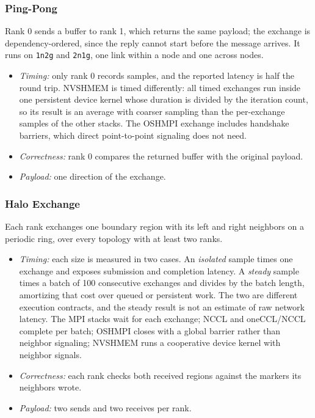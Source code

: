 \subsubsection{Ping-Pong}

Rank 0 sends a buffer to rank 1, which returns the same payload; the exchange is dependency-ordered, since the reply cannot start before the message arrives. It runs on \texttt{1n2g} and \texttt{2n1g}, one link within a node and one across nodes.
\begin{itemize}
    \item \emph{Timing:} only rank 0 records samples, and the reported latency is half the round trip. NVSHMEM is timed differently: all timed exchanges run inside one persistent device kernel whose duration is divided by the iteration count, so its result is an average with coarser sampling than the per-exchange samples of the other stacks. The OSHMPI exchange includes handshake barriers, which direct point-to-point signaling does not need.
    \item \emph{Correctness:} rank 0 compares the returned buffer with the original payload.
    \item \emph{Payload:} one direction of the exchange.
\end{itemize}

\subsubsection{Halo Exchange}

Each rank exchanges one boundary region with its left and right neighbors on a periodic ring, over every topology with at least two ranks.
\begin{itemize}
    \item \emph{Timing:} each size is measured in two cases. An \emph{isolated} sample times one exchange and exposes submission and completion latency. A \emph{steady} sample times a batch of 100 consecutive exchanges and divides by the batch length, amortizing that cost over queued or persistent work. The two are different execution contracts, and the steady result is not an estimate of raw network latency. The MPI stacks wait for each exchange; NCCL and oneCCL/NCCL complete per batch; OSHMPI closes with a global barrier rather than neighbor signaling; NVSHMEM runs a cooperative device kernel with neighbor signals.
    \item \emph{Correctness:} each rank checks both received regions against the markers its neighbors wrote.
    \item \emph{Payload:} two sends and two receives per rank.
\end{itemize}

